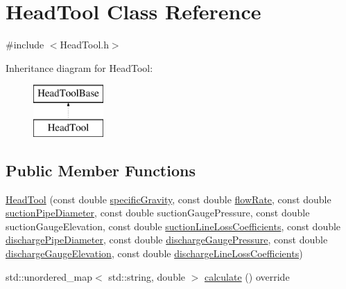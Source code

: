 \hypertarget{class_head_tool}{}\section{Head\+Tool Class Reference}
\label{class_head_tool}


{\ttfamily \#include $<$Head\+Tool.\+h$>$}

Inheritance diagram for Head\+Tool\+:\begin{figure}[H]
\begin{center}
\leavevmode
\includegraphics[height=2.000000cm]{d1/d4f/class_head_tool}
\end{center}
\end{figure}
\subsection*{Public Member Functions}
\begin{DoxyCompactItemize}
\item 
\hyperlink{class_head_tool_a9934c87c8f8eb515ff32e46c74004c0e}{Head\+Tool} (const double \hyperlink{class_head_tool_base_ae5af2380fb5db2c25281ef663a5fb65f}{specific\+Gravity}, const double \hyperlink{class_head_tool_base_acf4c03cb62cbf63aba017ce063989fbc}{flow\+Rate}, const double \hyperlink{class_head_tool_base_a357365fc5ef346ce7bcb089c9d1a95e1}{suction\+Pipe\+Diameter}, const double suction\+Gauge\+Pressure, const double suction\+Gauge\+Elevation, const double \hyperlink{class_head_tool_base_ac74c6f6f8ab387efe7b77e0ce6ecd84e}{suction\+Line\+Loss\+Coefficients}, const double \hyperlink{class_head_tool_base_a126a397bd3d87b68864e1962c70bb45e}{discharge\+Pipe\+Diameter}, const double \hyperlink{class_head_tool_base_a39c854f13b16967e02a67cd1aaee07c4}{discharge\+Gauge\+Pressure}, const double \hyperlink{class_head_tool_base_a9ed2160992f8da2e335d919cf9aedd08}{discharge\+Gauge\+Elevation}, const double \hyperlink{class_head_tool_base_a147c035c7422406c594c5fd42ab11eb0}{discharge\+Line\+Loss\+Coefficients})
\item 
std\+::unordered\+\_\+map$<$ std\+::string, double $>$ \hyperlink{class_head_tool_ab107e7717df4ca95404ce1952c21a84e}{calculate} () override
\end{DoxyCompactItemize}


